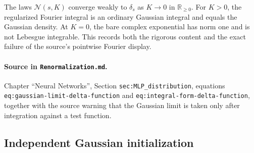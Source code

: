 \begin{theorem}
\label{thm:renorm:diracLimit}
The laws $\mathcal N(s,K)$ converge weakly to $\delta_s$ as $K\to0$ in $\mathbb R_{\ge0}$.
For $K>0$, the regularized Fourier integral is an ordinary Gaussian integral and equals the
Gaussian density.  At $K=0$, the bare complex exponential has norm one and is not Lebesgue
integrable.  This records both the rigorous content and the exact failure of the source's
pointwise Fourier display.

\paragraph{Source in \texttt{Renormalization.md}.}
Chapter ``Neural Networks'', Section \texttt{sec:MLP\_distribution}, equations
\texttt{eq:gaussian-limit-delta-function} and \texttt{eq:integral-form-delta-function}, together with
the source warning that the Gaussian limit is taken only after integration against a test function.
\end{theorem}

\subsection{Independent Gaussian initialization}

